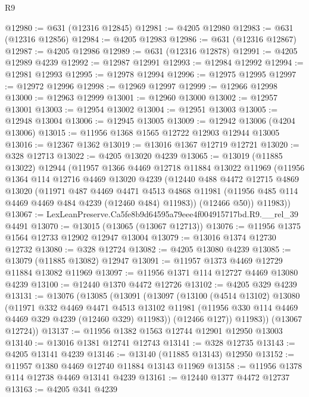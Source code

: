 \begin{lexlean}{R9}
\begin{coremodule}
@12980 := @631 (@12316 @12845)
@12981 := @4205 @12980
@12983 := @631 (@12316 @12856)
@12984 := @4205 @12983
@12986 := @631 (@12316 @12867)
@12987 := @4205 @12986
@12989 := @631 (@12316 @12878)
@12991 := @4205 @12989 @4239
@12992 := @12987 @12991
@12993 := @12984 @12992
@12994 := @12981 @12993
@12995 := @12978 @12994
@12996 := @12975 @12995
@12997 := @12972 @12996
@12998 := @12969 @12997
@12999 := @12966 @12998
@13000 := @12963 @12999
@13001 := @12960 @13000
@13002 := @12957 @13001
@13003 := @12954 @13002
@13004 := @12951 @13003
@13005 := @12948 @13004
@13006 := @12945 @13005
@13009 := @12942 @13006 (@4204 @13006)
@13015 := @11956 @1368 @1565 @12722 @12903 @12944 @13005
@13016 := @12367 @1362
@13019 := @13016 @1367 @12719 @12721
@13020 := @328 @12713
@13022 := @4205 @13020 @4239
@13065 := @13019
    (@11885 @13022)
    @12944
    (@11957
      @1366
      @4469
      @12718
      @11884
      @13022
      @11969
      (@11956
        @1364
        @114
        @12716
        @4469
        @13020
        @4239
        (@12440
          @488
          @4472
          @12715
          @4869
          @13020
          (@11971
            @487
            @4469
            @4471
            @4513
            @4868
            @11981
            (@11956 @485 @114 @4469 @4469 @484 @4239 (@12460 @484) @11983))
          (@12466 @50))
        @11983))
@13067 := LexLeanPreserve.Ca5fe8b9d64595a79eee4f004915717bd.R9.__rel_39 @4491
@13070 := @13015 (@13065 (@13067 @12713))
@13076 := @11956 @1375 @1564 @12733 @12902 @12947 @13004
@13079 := @13016 @1374 @12730 @12732
@13080 := @328 @12724
@13082 := @4205 @13080 @4239
@13085 := @13079 (@11885 @13082) @12947
@13091 := @11957 @1373 @4469 @12729 @11884 @13082 @11969
@13097 := @11956 @1371 @114 @12727 @4469 @13080 @4239
@13100 := @12440 @1370 @4472 @12726
@13102 := @4205 @329 @4239
@13131 := @13076
    (@13085
      (@13091
        (@13097
          (@13100
            (@4514 @13102)
            @13080
            (@11971
              @332
              @4469
              @4471
              @4513
              @13102
              @11981
              (@11956 @330 @114 @4469 @4469 @329 @4239 (@12460 @329) @11983))
            (@12466 @127))
          @11983))
      (@13067 @12724))
@13137 := @11956 @1382 @1563 @12744 @12901 @12950 @13003
@13140 := @13016 @1381 @12741 @12743
@13141 := @328 @12735
@13143 := @4205 @13141 @4239
@13146 := @13140 (@11885 @13143) @12950
@13152 := @11957 @1380 @4469 @12740 @11884 @13143 @11969
@13158 := @11956 @1378 @114 @12738 @4469 @13141 @4239
@13161 := @12440 @1377 @4472 @12737
@13163 := @4205 @341 @4239

\end{coremodule}
\end{lexlean}
